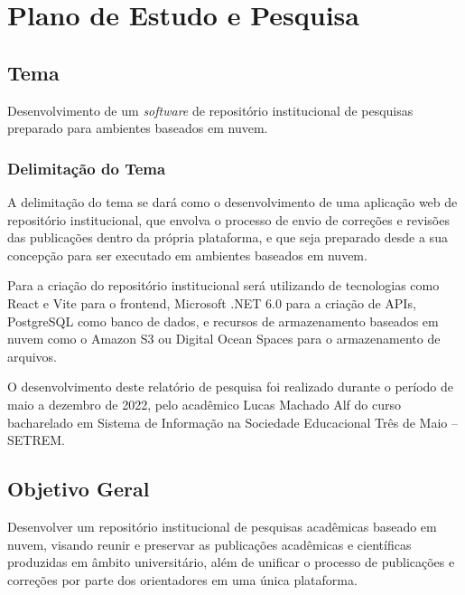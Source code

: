 \chapter{Plano de Estudo e Pesquisa} \label{chap:ResearchPlan}

\section{Tema} \label{sec::Theme}
Desenvolvimento de um \emph{software} de repositório institucional de
pesquisas preparado para ambientes baseados em nuvem.

\subsection{Delimitação do Tema} \label{subsec::ThemeDelimitation}

A delimitação do tema se dará como o desenvolvimento de uma aplicação
web de repositório institucional, que envolva o processo de envio
de correções e revisões das publicações dentro da própria plataforma,
e que seja preparado desde a sua concepção para ser executado em ambientes
baseados em nuvem.

Para a criação do repositório institucional será utilizando de tecnologias
como React e Vite para o frontend, Microsoft .NET 6.0 para a criação
de APIs, PostgreSQL como banco de dados, e recursos de armazenamento baseados em
nuvem como o Amazon S3 ou Digital Ocean Spaces para o armazenamento de arquivos.

O desenvolvimento deste relatório de pesquisa foi realizado durante o período de
maio a dezembro de 2022, pelo acadêmico Lucas Machado Alf do curso bacharelado
em Sistema de Informação na Sociedade Educacional Três de Maio – SETREM.

\section{Objetivo Geral} \label{sec:objective}

Desenvolver um repositório institucional de pesquisas acadêmicas
baseado em nuvem, visando reunir e preservar as publicações acadêmicas
e científicas produzidas em âmbito universitário, além de unificar o processo
de publicações e correções por parte dos orientadores em uma única plataforma.

